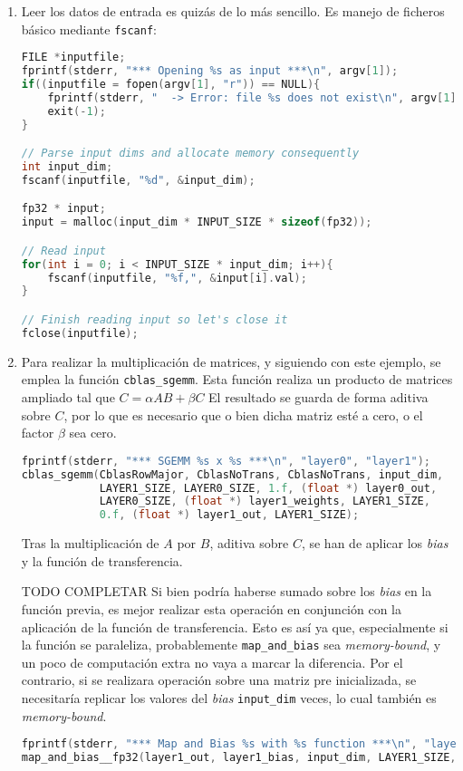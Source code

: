 \begin{enumerate}
    \item Leer los datos de entrada es quizás de lo más sencillo. Es manejo de ficheros básico mediante \texttt{fscanf}:\medskip
\begin{lstlisting}[language=C]
FILE *inputfile;
fprintf(stderr, "*** Opening %s as input ***\n", argv[1]);
if((inputfile = fopen(argv[1], "r")) == NULL){
    fprintf(stderr, "  -> Error: file %s does not exist\n", argv[1]);
    exit(-1);
}

// Parse input dims and allocate memory consequently
int input_dim;
fscanf(inputfile, "%d", &input_dim);

fp32 * input;
input = malloc(input_dim * INPUT_SIZE * sizeof(fp32));

// Read input
for(int i = 0; i < INPUT_SIZE * input_dim; i++){
    fscanf(inputfile, "%f,", &input[i].val);
}

// Finish reading input so let's close it
fclose(inputfile);
\end{lstlisting}

    \item Para realizar la multiplicación de matrices, y siguiendo con este ejemplo, se emplea la función \texttt{cblas\_sgemm}. Esta función realiza un producto de matrices ampliado tal que $C = \alpha AB + \beta C$ El resultado se guarda de forma aditiva sobre $C$, por lo que es necesario que o bien dicha matriz esté a cero, o el factor $\beta$ sea cero.\medskip
\begin{lstlisting}[language=C]
fprintf(stderr, "*** SGEMM %s x %s ***\n", "layer0", "layer1");
cblas_sgemm(CblasRowMajor, CblasNoTrans, CblasNoTrans, input_dim,
            LAYER1_SIZE, LAYER0_SIZE, 1.f, (float *) layer0_out,
            LAYER0_SIZE, (float *) layer1_weights, LAYER1_SIZE,
            0.f, (float *) layer1_out, LAYER1_SIZE);
\end{lstlisting}

    Tras la multiplicación de $A$ por $B$, aditiva sobre $C$, se han de aplicar los \textit{bias} y la función de transferencia. 
    
    
    
    
    
    
    
    TODO COMPLETAR Si bien podría haberse sumado sobre los \textit{bias} en la función previa, es mejor realizar esta operación en conjunción con la aplicación de la función de transferencia. Esto es así ya que, especialmente si la función se paraleliza, probablemente \texttt{map\_and\_bias} sea \textit{memory-bound}, y un poco de computación extra no vaya a marcar la diferencia. Por el contrario, si se realizara operación sobre una matriz pre inicializada, se necesitaría replicar los valores del \textit{bias} \texttt{input\_dim} veces, lo cual también es \textit{memory-bound}.
\begin{lstlisting}[language=C]
fprintf(stderr, "*** Map and Bias %s with %s function ***\n", "layer1_out", "sigmoid__fp32");
map_and_bias__fp32(layer1_out, layer1_bias, input_dim, LAYER1_SIZE, 'N', sigmoid__fp32);
\end{lstlisting}


\end{enumerate}
